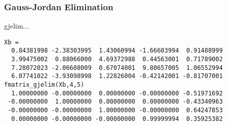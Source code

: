 \subsubsection{Gauss-Jordan Elimination}

gjelim...
\begin{verbatim}
Xb =
  0.84381998 -2.38303995  1.43060994 -1.66603994  0.91488999
  3.99475002  0.88066000  4.69372988  0.44563001  0.71789002
  7.28072023 -2.06608009  0.67074001  9.80657005  1.06552994
  6.07741022 -3.93098998  1.22826004 -0.42142001 -0.81707001
fmatrix_gjelim(Xb,4,5)
  1.00000000 -0.00000000  0.00000000 -0.00000000 -0.51971692
 -0.00000000  1.00000000  0.00000000  0.00000000 -0.43340963
 -0.00000000 -0.00000000  1.00000000 -0.00000000  0.64247853
  0.00000000 -0.00000000 -0.00000000  0.99999994  0.35925382
\end{verbatim}

